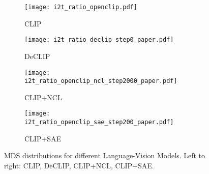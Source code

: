 \begin{figure}[t]
    \centering
    \begin{subfigure}{0.22\textwidth}
        \centering
        \texttt{[image: i2t\_ratio\_openclip.pdf]}
        \caption{CLIP}
        \label{fig:1}
    \end{subfigure}
    \hspace{-3mm}
    \begin{subfigure}{0.22\textwidth}
        \centering
        \texttt{[image: i2t\_ratio\_declip\_step0\_paper.pdf]}
        \caption{DeCLIP}
        \label{fig:2}
    \end{subfigure}
    \vspace{-3mm}
    \begin{subfigure}{0.22\textwidth}
        \centering
        \texttt{[image: i2t\_ratio\_openclip\_ncl\_step2000\_paper.pdf]}
        \caption{CLIP+NCL}
        \label{fig:3}
    \end{subfigure}
    \hspace{-3mm}
    \begin{subfigure}{0.22\textwidth}
        \centering
        \texttt{[image: i2t\_ratio\_openclip\_sae\_step200\_paper.pdf]}
        \caption{CLIP+SAE}
        \label{fig:4}
    \end{subfigure}
    \caption{\footnotesize MDS distributions for different Language-Vision Models. Left to right: CLIP, DeCLIP, CLIP+NCL, CLIP+SAE.}
    \label{fig:four_figures}
\end{figure}
